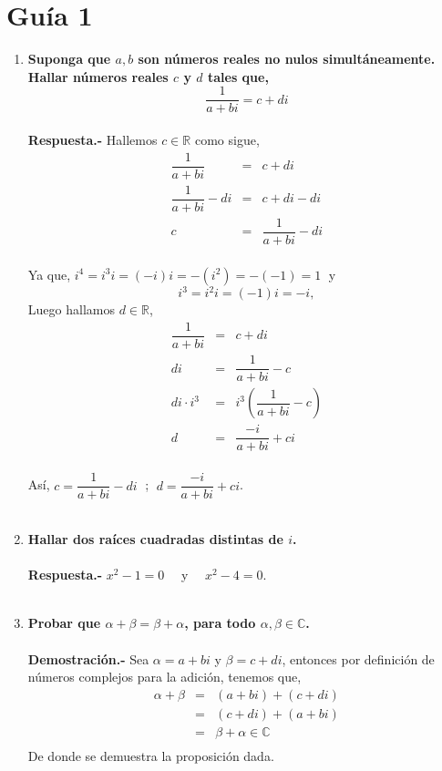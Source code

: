 
\section*{\center Guía 1}
\vspace{1.2cm}
\setlength{\columnsep}{.7cm}
\setlength{\columnseprule}{0.1pt}
\begin{multicols}{2}

\begin{enumerate}

    \item  \textbf{\boldmath Suponga que $a,b$ son números reales no nulos simultáneamente. Hallar números reales $c$ y $d$ tales que,
	$$\dfrac{1}{a+bi}=c+di$$\\}
	\textbf{Respuesta.-}\; Hallemos $c\in \mathbb{R}$ como sigue,
	$$\begin{array}{rcl}
	    \dfrac{1}{a+bi}&=&c+di\\
	    \dfrac{1}{a+bi} - di&=&c+di - di\\
	    c&=&\dfrac{1}{a+bi}-di\\
	\end{array}$$

	Ya que, $i^4 = i^3i=(-i)i=-(i^2) = -(-1) = 1\; $
	y $$i^3 = i^2i=(-1)i = -i,$$
	Luego hallamos $d\in \mathbb{R}$,
	$$\begin{array}{rcl}
	    \dfrac{1}{a+bi}&=&c+di\\
			   di&=&\dfrac{1}{a+bi}-c\\
			   di\cdot i^3&=&i^3\left(\dfrac{1}{a+bi}-c\right)\\
			   d&=&\dfrac{-i}{a+bi}+ci\\
	\end{array}$$

	Así, $c=\dfrac{1}{a+bi}-di\;$ ; $\; d=\dfrac{-i}{a+bi}+ci$.\\\\

    \item \textbf{\boldmath Hallar dos raíces cuadradas distintas de $i$.}\\\\
	\textbf{Respuesta.-}\; $x^2-1 = 0\quad $ y $\quad x^2-4=0$.\\\\  

    \item \textbf{\boldmath Probar que $\alpha+\beta = \beta +\alpha$, para todo $\alpha,\beta \in \mathbb{C}$.}\\\\
	\textbf{Demostración.-}\; Sea $\alpha = a+bi$ y $\beta = c+di$, entonces por definición de números complejos para la adición, tenemos que,
	$$\begin{array}{rcl}
	    \alpha + \beta &=&(a+bi)+(c+di)\\
			   &=&(c+di)+(a+bi)\\
			   &=&\beta + \alpha\in \mathbb{C}\\
	\end{array}$$
	De donde se demuestra la proposición dada.\\\\


\end{enumerate}
\end{multicols}
